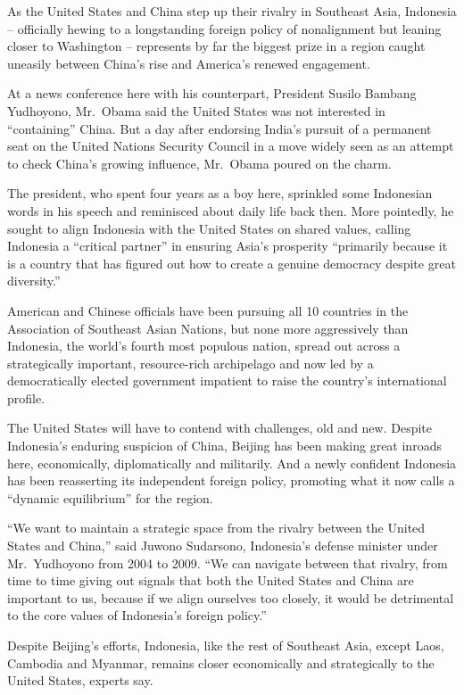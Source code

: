 ﻿\documentclass[12pt]{article}
\begin{document}
As the United States and China step up their rivalry in Southeast Asia, Indonesia -- officially
hewing to a longstanding foreign policy of nonalignment but leaning closer to Washington --
represents by far the biggest prize in a region caught uneasily between China's rise and America's
renewed engagement.

At a news conference here with his counterpart, President Susilo Bambang Yudhoyono, Mr.~Obama said
the United States was not interested in ``containing'' China. But a day after endorsing India's
pursuit of a permanent seat on the United Nations Security Council in a move widely seen as an
attempt to check China's growing influence, Mr.~Obama poured on the charm.

The president, who spent four years as a boy here, sprinkled some Indonesian words in his speech and
reminisced about daily life back then. More pointedly, he sought to align Indonesia with the United
States on shared values, calling Indonesia a ``critical partner'' in ensuring Asia's prosperity
``primarily because it is a country that has figured out how to create a genuine democracy despite
great diversity.''

American and Chinese officials have been pursuing all 10 countries in the Association of Southeast
Asian Nations, but none more aggressively than Indonesia, the world's fourth most populous nation,
spread out across a strategically important, resource-rich archipelago and now led by a
democratically elected government impatient to raise the country's international profile.

The United States will have to contend with challenges, old and new. Despite Indonesia's enduring
suspicion of China, Beijing has been making great inroads here, economically, diplomatically and
militarily. And a newly confident Indonesia has been reasserting its independent foreign policy,
promoting what it now calls a ``dynamic equilibrium'' for the region.

``We want to maintain a strategic space from the rivalry between the United States and China,'' said
Juwono Sudarsono, Indonesia's defense minister under Mr.~Yudhoyono from 2004 to 2009. ``We can
navigate between that rivalry, from time to time giving out signals that both the United States and
China are important to us, because if we align ourselves too closely, it would be detrimental to the
core values of Indonesia's foreign policy.''

Despite Beijing's efforts, Indonesia, like the rest of Southeast Asia, except Laos, Cambodia and
Myanmar, remains closer economically and strategically to the United States, experts say.
\end{document}
